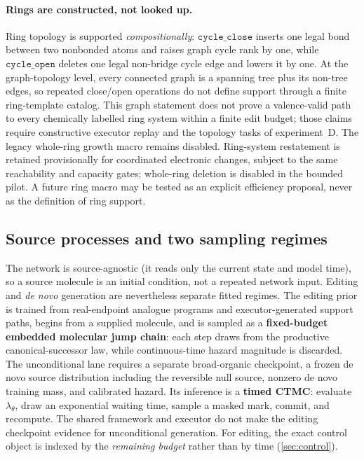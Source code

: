 \documentclass{article}
\newcommand{\op}[1]{\texttt{#1}}
\theoremstyle{definition}
\theoremstyle{remark}
\begin{document}
\paragraph{Rings are constructed, not looked up.}
Ring topology is supported \emph{compositionally}: $\op{cycle\_close}$ inserts one legal bond between two nonbonded atoms and raises graph cycle rank by one, while $\op{cycle\_open}$ deletes one legal non-bridge cycle edge and lowers it by one. At the graph-topology level, every connected graph is a spanning tree plus its non-tree edges, so repeated close/open operations do not define support through a finite ring-template catalog. This graph statement does not prove a valence-valid path to every chemically labelled ring system within a finite edit budget; those claims require constructive executor replay and the topology tasks of experiment~D. The legacy whole-ring growth macro remains disabled. Ring-system restatement is retained provisionally for coordinated electronic changes, subject to the same reachability and capacity gates; whole-ring deletion is disabled in the bounded pilot. A future ring macro may be tested as an explicit efficiency proposal, never as the definition of ring support.

\subsection{Source processes and two sampling regimes}
\label{sec:sampling}

The network is source-agnostic (it reads only the current state and model time), so a source molecule is an initial condition, not a repeated network input. Editing and \emph{de novo} generation are nevertheless separate fitted regimes. The editing prior is trained from real-endpoint analogue programs and executor-generated support paths, begins from a supplied molecule, and is sampled as a \textbf{fixed-budget embedded molecular jump chain}: each step draws from the productive canonical-successor law, while continuous-time hazard magnitude is discarded. The unconditional lane requires a separate broad-organic checkpoint, a frozen de novo source distribution including the reversible null source, nonzero de novo training mass, and calibrated hazard. Its inference is a \textbf{timed CTMC}: evaluate $\lambda_\theta$, draw an exponential waiting time, sample a masked mark, commit, and recompute. The shared framework and executor do not make the editing checkpoint evidence for unconditional generation. For editing, the exact control object is indexed by the \emph{remaining budget} rather than by time (\cref{sec:control}).
\end{document}
